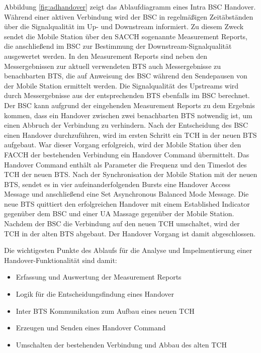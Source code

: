 Abbildung \ref{fig:adhandover} zeigt das Ablaufdiagramm eines Intra BSC Handover. Während einer aktiven Verbindung wird der BSC in regelmäßigen Zeitäbständen über die Signalqualität im Up- und Downstream informiert. Zu diesem Zweck sendet die Mobile Station über den SACCH sogenannte Measurement Reports, die anschließend im BSC zur Bestimmung der Downstream-Signalqualität ausgewertet werden. In den Measurement Reports sind neben den Messergebnissen zur aktuell verwendeten BTS auch Messergebnisse zu benachbarten BTS, die auf Anweisung des BSC während den Sendepausen von der Mobile Station ermittelt werden. Die Signalqualität des Upstreams wird durch Messergebnisse aus der entsprechenden BTS ebenfalls im BSC berechnet. Der BSC kann aufgrund der eingehenden Measurement Reports zu dem Ergebnis kommen, dass ein Handover zwischen zwei benachbarten BTS notwendig ist, um einen Abbruch der Verbindung zu verhindern. Nach der Entscheidung des BSC einen Handover durchzuführen, wird im ersten Schritt ein TCH in der neuen BTS aufgebaut. War dieser Vorgang erfolgreich, wird der Mobile Station über den FACCH der bestehenden Verbindung ein Handover Command übermittelt. Das Handover Command enthält als Parameter die Frequenz und den Timeslot des TCH der neuen BTS. Nach der Synchronisation der Mobile Station mit der neuen BTS, sendet es in vier aufeinanderfolgenden Bursts eine Handover Access Message und anschließend eine Set Asynchronous Balanced Mode Message. Die neue BTS quittiert den erfolgreichen Handover mit einem Established Indicator gegenüber dem BSC und einer UA Massage gegenüber der Mobile Station. Nachdem der BSC die Verbindung auf den neuen TCH umschaltet, wird der TCH in der alten BTS abgebaut. Der Handover Vorgang ist damit abgeschlossen.

Die wichtigesten Punkte des Ablaufs für die Analyse und Impelmentierung einer Handover-Funktionalität sind damit:

\begin{itemize}
 \item Erfassung und Auswertung der Measurement Reports
 \item Logik für die Entscheidungsfindung eines Handover
 \item Inter BTS Kommunikation zum Aufbau eines neuen TCH
 \item Erzeugen und Senden eines Handover Command
 \item Umschalten der bestehenden Verbindung und Abbau des alten TCH
\end{itemize}

